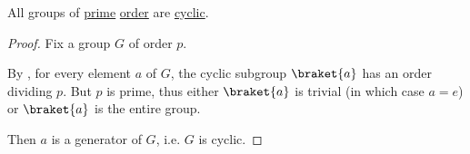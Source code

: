 \begin{proposition}\label{thm:single_group_of_prime_order}
  All groups of \hyperref[def:prime_number]{prime} \hyperref[def:group_order]{order} are \hyperref[def:cyclic_group]{cyclic}.
\end{proposition}
\begin{proof}
  Fix a group \( G \) of order \( p \).

  By , for every element \( a \) of \( G \), the cyclic subgroup \( \braket{ a } \) has an order dividing \( p \). But \( p \) is prime, thus either \( \braket{ a } \) is trivial (in which case \( a = e \)) or \( \braket{ a } \) is the entire group.

  Then \( a \) is a generator of \( G \), i.e. \( G \) is cyclic.
\end{proof}

